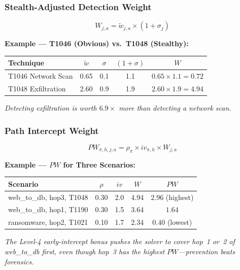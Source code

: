 \documentclass[journal]{IEEEtran}
\newcommand{\tildeW}{\tilde{w}}
\begin{document}
\subsubsection{Stealth-Adjusted Detection Weight}
\begin{equation}
  W_{j,a} = \tildeW_{j,a} \times (1 + \sigma_j)
\end{equation}

\begin{examplebox}
\textbf{Example --- T1046 (Obvious) vs.\ T1048 (Stealthy):}
\begin{center}
\small
\renewcommand{\arraystretch}{1.1}
\begin{tabular}{@{}lcccc@{}}
\toprule
\textbf{Technique} & $\tildeW$ & $\sigma$ &
$(1+\sigma)$ & $W$ \\
\midrule
T1046 Network Scan  & 0.65 & 0.1 & 1.1 &
  $0.65\!\times\!1.1=\mathbf{0.72}$ \\
T1048 Exfiltration  & 2.60 & 0.9 & 1.9 &
  $2.60\!\times\!1.9=\mathbf{4.94}$ \\
\bottomrule
\end{tabular}
\end{center}
\textit{Detecting exfiltration is worth $\mathbf{6.9}\times$
more than detecting a network scan.}
\end{examplebox}

\subsubsection{Path Intercept Weight}
\begin{equation}
  PW_{\pi,h,j,a} = \rho_\pi \times iv_{\pi,h} \times W_{j,a}
\end{equation}

\begin{examplebox}
\textbf{Example --- $PW$ for Three Scenarios:}
\begin{center}
\small
\renewcommand{\arraystretch}{1.1}
\begin{tabular}{@{}lcccc@{}}
\toprule
\textbf{Scenario} & $\rho$ & $iv$ & $W$ & $PW$ \\
\midrule
web\_to\_db, hop3, T1048  & 0.30 & 2.0 & 4.94 &
  $\mathbf{2.96}$ (highest) \\
web\_to\_db, hop1, T1190  & 0.30 & 1.5 & 3.64 & $\mathbf{1.64}$ \\
ransomware, hop2, T1021   & 0.10 & 1.7 & 2.34 &
  $\mathbf{0.40}$ (lowest) \\
\bottomrule
\end{tabular}
\end{center}
\textit{The Level-4 early-intercept bonus pushes the solver
to cover hop~1 or~2 of web\_to\_db first, even though hop~3
has the highest $PW$---prevention beats forensics.}
\end{examplebox}
\end{document}
